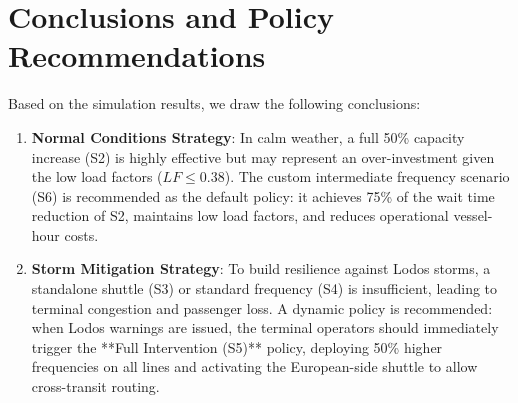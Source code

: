 \documentclass[11pt,a4paper]{article}
\begin{document}
\section{Conclusions and Policy Recommendations}
Based on the simulation results, we draw the following conclusions:
\begin{enumerate}
    \item \textbf{Normal Conditions Strategy}: In calm weather, a full 50\% capacity increase (S2) is highly effective but may represent an over-investment given the low load factors ($LF \le 0.38$). The custom intermediate frequency scenario (S6) is recommended as the default policy: it achieves 75\% of the wait time reduction of S2, maintains low load factors, and reduces operational vessel-hour costs.
    \item \textbf{Storm Mitigation Strategy}: To build resilience against Lodos storms, a standalone shuttle (S3) or standard frequency (S4) is insufficient, leading to terminal congestion and passenger loss. A dynamic policy is recommended: when Lodos warnings are issued, the terminal operators should immediately trigger the **Full Intervention (S5)** policy, deploying 50\% higher frequencies on all lines and activating the European-side shuttle to allow cross-transit routing.
\end{enumerate}
\end{document}
